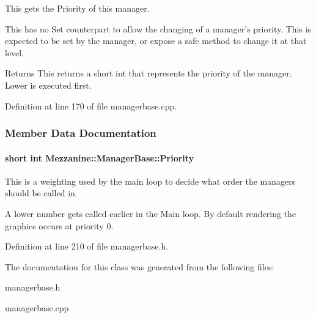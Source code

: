 This gets the Priority of this manager. 

This has no Set counterpart to allow the changing of a manager's priority. This is expected to be set by the manager, or expose a safe method to change it at that level. \begin{DoxyReturn}{Returns}
This returns a short int that represents the priority of the manager. Lower is executed first. 
\end{DoxyReturn}


Definition at line 170 of file managerbase.cpp.



\subsubsection{Member Data Documentation}
\hypertarget{classMezzanine_1_1ManagerBase_a96fb02bf2f4e8b4afe70dedd0d8c6ac9}{
\paragraph[{Priority}]{\setlength{\rightskip}{0pt plus 5cm}short int {\bf Mezzanine::ManagerBase::Priority}}\hfill}
\label{classMezzanine_1_1ManagerBase_a96fb02bf2f4e8b4afe70dedd0d8c6ac9}


This is a weighting used by the main loop to decide what order the managers should be called in. 

A lower number gets called earlier in the Main loop. By default rendering the graphics occurs at priority 0. 

Definition at line 210 of file managerbase.h.



The documentation for this class was generated from the following files:\begin{DoxyCompactItemize}
\item 
managerbase.h\item 
managerbase.cpp\end{DoxyCompactItemize}
